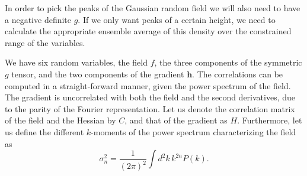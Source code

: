 \documentclass[twocolumn]{emulateapj}
\newcommand{\hh}{\mathbf{h}}
\begin{document}
In order to pick the peaks of the Gaussian random field we will also need to have 
a negative definite $g$. If we only want peaks of a certain height, we need to 
calculate the appropriate ensemble average of this density over the constrained 
range of the variables.

We have six random variables, the field $f$, the three components of the symmetric 
$g$ tensor, and the two components of the gradient $\hh$. The correlations can be 
computed in a straight-forward manner, given the power spectrum of the field. The
gradient is uncorrelated with both the field and the second derivatives, due to the
parity of the Fourier representation. Let us denote the correlation matrix of the
field and the Hessian by $C$, and that of the gradient as $H$. Furthermore, let us 
define the different $k$-moments of the power spectrum characterizing the field as
\begin{equation}
	\sigma_n^2 = \frac{1}{(2\pi)^2} \int d^2k\, k^{2n} P(k).
\end{equation}
\end{document}
